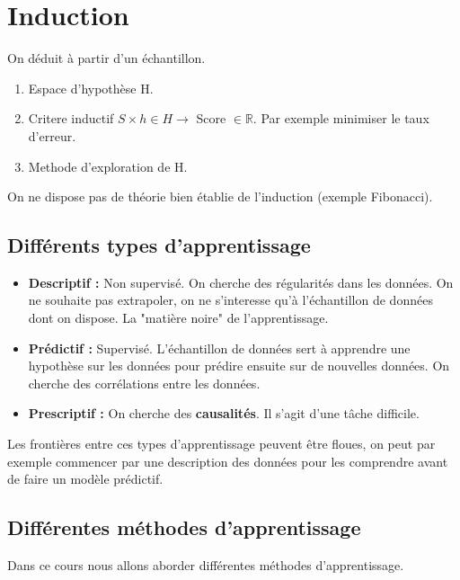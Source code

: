\documentclass{article}
\begin{document}
\section{Induction}

On déduit à partir d'un échantillon.

\begin{enumerate}
\item Espace d'hypothèse H.
\item Critere inductif $ S \times h \in H \rightarrow $ Score $\in \mathbb{R}$. Par exemple minimiser le taux d'erreur.
\item Methode d'exploration de H.
\end{enumerate}

On ne dispose pas de théorie bien établie de l'induction (exemple Fibonacci).

\subsection{Différents types d'apprentissage}
\begin{itemize}
\item \textbf{Descriptif :} Non supervisé. On cherche des régularités dans les données. On ne souhaite pas extrapoler, on ne s'interesse qu'à l'échantillon de données dont on dispose. La "matière noire" de l'apprentissage.
\item \textbf{Prédictif :} Supervisé. L'échantillon de données sert à apprendre une hypothèse sur les données pour prédire ensuite sur de nouvelles données. On cherche des corrélations entre les données.
\item \textbf{Prescriptif :} On cherche des \textbf{causalités}. Il s'agit d'une tâche difficile.
\end{itemize}

Les frontières entre ces types d'apprentissage peuvent être floues, on peut par exemple commencer par une description des données pour les comprendre avant de faire un modèle prédictif.

\subsection{Différentes méthodes d'apprentissage}

Dans ce cours nous allons aborder différentes méthodes d'apprentissage.
\end{document}

